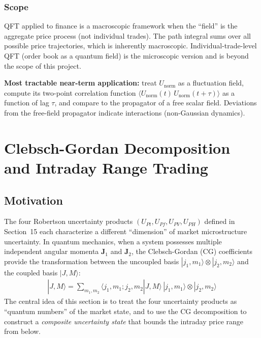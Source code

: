 \documentclass[11pt]{article}
\begin{document}
\subsubsection{Scope}

QFT applied to finance is a macroscopic framework when the ``field'' is the aggregate price process (not individual trades). The path integral sums over all possible price trajectories, which is inherently macroscopic. Individual-trade-level QFT (order book as a quantum field) is the microscopic version and is beyond the scope of this project.

\textbf{Most tractable near-term application:} treat $U_\mathrm{norm}$ as a fluctuation field, compute its two-point correlation function $\langle U_\mathrm{norm}(t)\, U_\mathrm{norm}(t+\tau) \rangle$ as a function of lag $\tau$, and compare to the propagator of a free scalar field. Deviations from the free-field propagator indicate interactions (non-Gaussian dynamics).

\section{Clebsch-Gordan Decomposition and Intraday Range Trading}

\subsection{Motivation}

The four Robertson uncertainty products $(U_{Pt}, U_{Pf}, U_{PV}, U_{PH})$ defined in Section~15 each characterize a different ``dimension'' of market microstructure uncertainty. In quantum mechanics, when a system possesses multiple independent angular momenta $\mathbf{J}_1$ and $\mathbf{J}_2$, the Clebsch-Gordan (CG) coefficients provide the transformation between the uncoupled basis $|j_1, m_1\rangle \otimes |j_2, m_2\rangle$ and the coupled basis $|J, M\rangle$:
\begin{align}
    |J, M\rangle = \sum_{m_1, m_2} \langle j_1, m_1; j_2, m_2 | J, M \rangle\, |j_1, m_1\rangle \otimes |j_2, m_2\rangle
\end{align}
The central idea of this section is to treat the four uncertainty products as ``quantum numbers'' of the market state, and to use the CG decomposition to construct a \textit{composite uncertainty state} that bounds the intraday price range from below.
\end{document}

